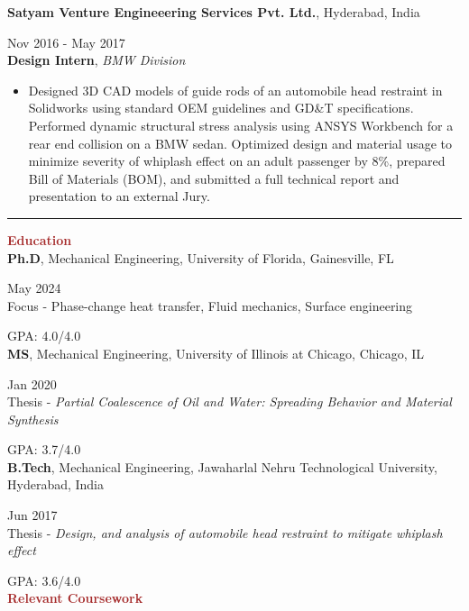 \documentclass[11pt, letterpaper]{article}
\begin{document}
\textbf{Satyam Venture Engineeering Services Pvt. Ltd.}, Hyderabad, India \hfill \raggedright{Nov 2016 - May 2017}\\
\textbf{Design Intern}, \textit{BMW Division}
\begin{itemize}[leftmargin=*]
\setlength\itemsep{-2pt}
\vspace{-5pt}
\item Designed 3D CAD models of guide rods of an automobile head restraint in Solidworks using standard OEM guidelines and GD\&T specifications. Performed dynamic structural stress analysis using ANSYS Workbench for a rear end collision on a BMW sedan. Optimized design and material usage to minimize severity of whiplash effect on an adult passenger by 8\%, prepared Bill of Materials (BOM), and submitted a full technical report and presentation to an external Jury.
\end{itemize}
\vspace{-8pt}
\noindent \rule[2pt]{\textwidth}{0.5pt}
\noindent \textbf{\large \textcolor{Brown}{Education}}\vspace{2pt}\\
\textbf{Ph.D}, Mechanical Engineering, University of Florida, Gainesville, FL \hfill \raggedright{May 2024}\\
 Focus - Phase-change heat transfer, Fluid mechanics, Surface engineering \hfill \raggedright{GPA: 4.0/4.0}\\
\vspace{6pt}
\textbf{MS}, Mechanical Engineering, University of Illinois at Chicago, Chicago, IL \hfill \raggedright{Jan 2020}\\
Thesis - \textit{Partial Coalescence of Oil and Water: Spreading Behavior and Material Synthesis} \hfill \raggedright{GPA: 3.7/4.0}\\
\vspace{6pt}
\textbf{B.Tech}, Mechanical Engineering, Jawaharlal Nehru Technological University, Hyderabad, India \hfill \raggedright{Jun 2017}\\
Thesis - \textit{Design, and analysis of automobile head restraint to mitigate whiplash effect} \hfill \raggedright{GPA: 3.6/4.0}
\\[6pt]
\noindent \textbf{\large \textcolor{Brown}{Relevant Coursework}}\vspace{2pt} \\
\end{document}
